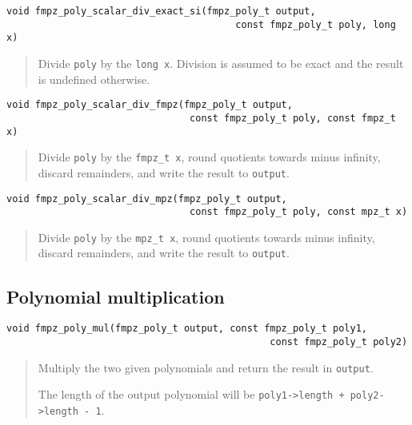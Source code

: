 \documentclass[a4paper,10pt]{article}
\newcommand{\code}{\lstinline}
\begin{document}
\begin{lstlisting}
void fmpz_poly_scalar_div_exact_si(fmpz_poly_t output, 
                                        const fmpz_poly_t poly, long x)
\end{lstlisting}
\begin{quote}
Divide \code{poly} by the \code{long x}. Division is assumed to be exact and the result is undefined otherwise.
\end{quote}

\begin{lstlisting}
void fmpz_poly_scalar_div_fmpz(fmpz_poly_t output, 
                                const fmpz_poly_t poly, const fmpz_t x) 
\end{lstlisting}
\begin{quote}
Divide \code{poly} by the \code{fmpz_t x}, round quotients towards minus infinity, discard remainders, and write the result to \code{output}. 
\end{quote}

\begin{lstlisting}
void fmpz_poly_scalar_div_mpz(fmpz_poly_t output, 
                                const fmpz_poly_t poly, const mpz_t x) 
\end{lstlisting}
\begin{quote}
Divide \code{poly} by the \code{mpz_t x}, round quotients towards minus infinity, discard remainders, and write the result to \code{output}. 
\end{quote}

\subsection{Polynomial multiplication}

\begin{lstlisting}
void fmpz_poly_mul(fmpz_poly_t output, const fmpz_poly_t poly1, 
                                              const fmpz_poly_t poly2) 
\end{lstlisting}
\begin{quote}
Multiply the two given polynomials and return the result in \code{output}.

The length of the output polynomial will be \code{poly1->length + poly2->length - 1}.
\end{quote}
\end{document}
